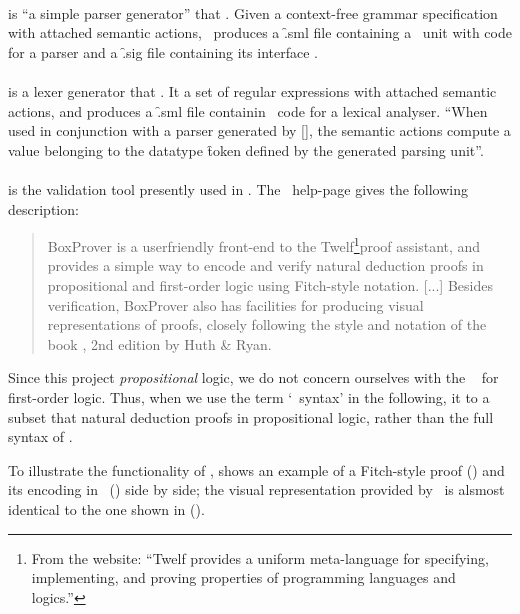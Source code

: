 \documentclass[BA.tex]{subfiles}
\begin{document}
\paragraph{\yac} is ``a simple parser generator''\cite[p.~44]{mosman}
 that  \mos .
 Given a context-free grammar specification with attached semantic actions,
 \yac\ produces a \f{.sml} file containing a \mos\ unit with code for
 a parser and a \f{.sig} file containing its interface
 \cite[]{mosman}.

\paragraph{\lex} is a lexer generator that  \mos . It 
  a set of regular expressions with attached semantic actions,
 and produces a \f{.sml} file containin \mos\ code for a lexical
 analyser\cite[p.~40]{mosman}. ``When used in conjunction with a parser
 generated by [\yac], the semantic actions compute a value belonging to
 the datatype \f{token} defined by the generated parsing 
 unit''\cite[\emph{ibid.}]{mosman}.

\paragraph{\bp \cite{box}} is the validation tool presently used in \course.
The \bp\ help-page\cite{boxhelp} gives the following
 description:
\begin{quote}
BoxProver is a userfriendly front-end to the Twelf\footnote{From
 the  website\cite{twelf}: ``Twelf provides a uniform meta-language
 for specifying, implementing, and proving properties of programming
 languages and logics.''}proof assistant, and
 provides a simple way to encode and verify natural deduction proofs in
 propositional and first-order logic using Fitch-style notation. [...] 
 Besides verification, BoxProver also has facilities for producing visual
 representations of proofs, closely following the style and notation of
 the book \book, 2nd edition by Huth \& Ryan.
\end{quote}
Since this project  \emph{propositional} logic, we do not
 concern ourselves with the \bp\  for first-order logic. 
 Thus, when we use the term `\bp\ syntax' in the following, it 
 to a subset that  natural deduction proofs in propositional
 logic, rather than the full syntax of \bp.

To illustrate the functionality of \bp ,  shows an example
 of a Fitch-style proof () and its encoding in \bp\ 
 () side by side; the visual representation provided by
 \bp\ is alsmost identical to the one shown in (\subref{sf:fs}).
\end{document}
